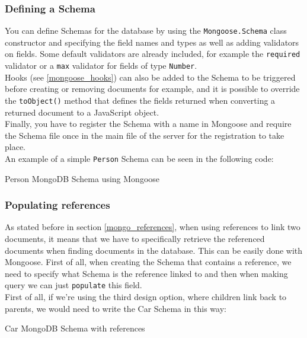 \documentclass[twoside, openright,11pt,a4paper]{book}
\newenvironment{code}{\captionsetup{type=listing}}{}
\begin{document}
\subsubsection{Defining a Schema}
You can define Schemas\cite{mongoose:doc:schemas} for the database by using the \verb+Mongoose.Schema+ class constructor and specifying the field names and types as well as adding validators on fields. Some default validators are already included, for example the \verb+required+ validator or a \verb+max+ validator for fields of type \verb+Number+. \\

Hooks (see \ref{mongoose_hooks}) can also be added to the Schema to be triggered before creating or removing documents for example, and it is possible to override the \verb+toObject()+ method that defines the fields returned when converting a returned document to a JavaScript object. \\

Finally, you have to register the Schema with a name in Mongoose and require the Schema file once in the main file of the server for the registration to take place.\\

An example of a simple \verb+Person+ Schema can be seen in the following code:
\begin{code}
	\caption{Person MongoDB Schema using Mongoose}
\end{code}
\subsubsection{Populating references}
\label{populating_refs}
As stated before in section \ref{mongo_references}, when using references to link two documents, it means that we have to specifically retrieve the referenced documents when finding documents in the database. This can be easily done with Mongoose. First of all, when creating the Schema that contains a reference, we need to specify what Schema is the reference linked to and then when making query we can just \verb+populate+ this field. \\

First of all, if we're using the third design option, where children link back to parents, we would need to write the Car Schema in this way:
\begin{code}
	\caption{Car MongoDB Schema with references}
\end{code}
\end{document}

